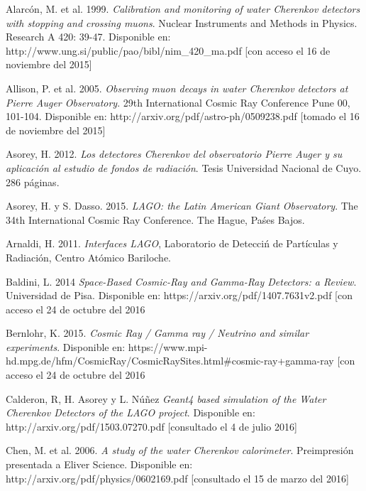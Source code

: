 \documentclass{book}
\begin{document}
\Biblio
\begin{thebibliography}{9}
\Bibliotoc
{} Alarc\'on, M. et al. 1999. \textit{Calibration and monitoring of water Cherenkov detectors with stopping and crossing muons}. Nuclear Instruments and Methods in Physics. Research A 420: 39-47. Disponible en: http://www.ung.si/public/pao/bibl/nim\_420\_ma.pdf [con acceso el 16 de noviembre del 2015]

 Allison, P. et al. 2005. \textit{Observing muon decays in water Cherenkov detectors at Pierre Auger Observatory}. 29th International Cosmic Ray Conference Pune 00, 101-104. Disponible en: http://arxiv.org/pdf/astro-ph/0509238.pdf [tomado el 16 de noviembre del 2015]


 Asorey, H. 2012. \textit{Los detectores Cherenkov del observatorio Pierre Auger y su aplicaci\'on al estudio de fondos de radiaci\'on}. Tesis Universidad Nacional de Cuyo. 286 p\'aginas.

 Asorey, H. y S. Dasso. 2015. \textit{LAGO: the Latin American Giant Observatory}. The 34th International Cosmic Ray Conference. The Hague, Pa\'ses Bajos.

 Arnaldi, H. 2011. \textit{Interfaces LAGO}, Laboratorio de Detecci\'n de Part\'iculas y Radiaci\'on, Centro At\'omico Bariloche.

 Baldini, L. 2014 \textit{Space-Based Cosmic-Ray and Gamma-Ray Detectors: a Review}. Universidad de Pisa. Disponible en: https://arxiv.org/pdf/1407.7631v2.pdf [con acceso el 24 de octubre del 2016

 Bernlohr, K. 2015. \textit{Cosmic Ray / Gamma ray / Neutrino and similar experiments}. Disponible en: https://www.mpi-hd.mpg.de/hfm/CosmicRay/CosmicRaySites.html\#cosmic-ray+gamma-ray [con acceso el 24 de octubre del 2016

 Calderon, R, H. Asorey y L. N\'u\~nez \textit{Geant4 based simulation of the Water Cherenkov Detectors of the LAGO project}. Disponible en: http://arxiv.org/pdf/1503.07270.pdf [consultado el 4 de julio 2016]

 Chen, M. et al. 2006. \textit{A study of the water Cherenkov calorimeter}. Preimpresi\'on presentada a Eliver Science. Disponible en: http://arxiv.org/pdf/physics/0602169.pdf [consultado el 15 de marzo del 2016]


\end{thebibliography}
\end{document}
